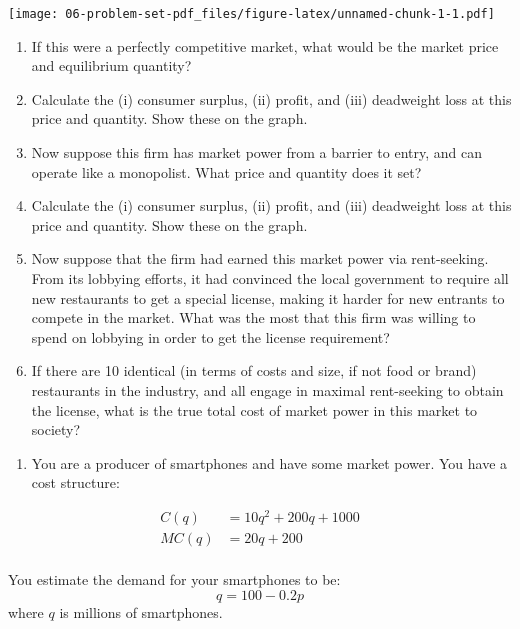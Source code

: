 \documentclass[
  11pt,
]{article}
\providecommand{\tightlist}{%
  \setlength{\itemsep}{0pt}\setlength{\parskip}{0pt}}
\begin{document}
\texttt{[image: 06-problem-set-pdf\_files/figure-latex/unnamed-chunk-1-1.pdf]}

\begin{enumerate}
\def\labelenumi{\alph{enumi}.}
\tightlist
\item
  If this were a perfectly competitive market, what would be the market
  price and equilibrium quantity?
\item
  Calculate the (i) consumer surplus, (ii) profit, and (iii) deadweight
  loss at this price and quantity. Show these on the graph.
\item
  Now suppose this firm has market power from a barrier to entry, and
  can operate like a monopolist. What price and quantity does it set?
\item
  Calculate the (i) consumer surplus, (ii) profit, and (iii) deadweight
  loss at this price and quantity. Show these on the graph.
\item
  Now suppose that the firm had earned this market power via
  rent-seeking. From its lobbying efforts, it had convinced the local
  government to require all new restaurants to get a special license,
  making it harder for new entrants to compete in the market. What was
  the most that this firm was willing to spend on lobbying in order to
  get the license requirement?
\item
  If there are 10 identical (in terms of costs and size, if not food or
  brand) restaurants in the industry, and all engage in maximal
  rent-seeking to obtain the license, what is the true total cost of
  market power in this market to society?
\end{enumerate}

\clearpage

\begin{enumerate}
\def\labelenumi{\arabic{enumi}.}
\setcounter{enumi}{7}
\tightlist
\item
  You are a producer of smartphones and have some market power. You have
  a cost structure:
\end{enumerate}

\[\begin{aligned}
C(q)&=10q^2+200q+1000\\
MC(q)&=20q+200\\
\end{aligned}\]

You estimate the demand for your smartphones to be: \[q=100-0.2p\] where
\(q\) is millions of smartphones.
\end{document}
